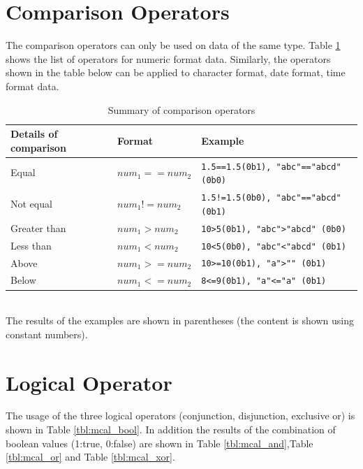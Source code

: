 \section{Comparison Operators }
The comparison operators can only be used on data of the same type. Table \ref{tbl:mcal_ope_comp} shows the list of operators for numeric format data. Similarly, the operators shown in the table below can be applied to character format, date format, time format data.  


\begin{table}[!hb]
\begin{center}
\caption{Summary of comparison operators \label{tbl:mcal_ope_comp}}
{\small
  \begin{tabular}{l|l|l} \hline
Details of comparison&Format&Example\\
\hline
Equal   & $num_1==num_2$ & \verb|1.5==1.5(0b1), "abc"=="abcd" (0b0)|\\
Not equal & $num_1!=num_2$ & \verb|1.5!=1.5(0b0), "abc"=="abcd" (0b1)|\\
Greater than & $num_1>num_2$  & \verb|10>5(0b1), "abc">"abcd" (0b0)|\\
Less than & $num_1<num_2$  & \verb|10<5(0b0), "abc"<"abcd" (0b1)|\\
Above       & $num_1>=num_2$ & \verb|10>=10(0b1), "a">"" (0b1) |\\
Below      & $num_1<=num_2$ & \verb|8<=9(0b1), "a"<="a" (0b1)| \\
\hline
  \end{tabular}
\\The results of the examples are shown in parentheses (the content is shown using constant numbers).  }
  \end{center}
\end{table}


\section{Logical Operator}
The usage of the three logical operators (conjunction, disjunction, exclusive or) is shown in Table \ref{tbl:mcal_bool}. In addition the results of the combination of boolean values (1:true, 0:false)  are shown in Table \ref{tbl:mcal_and},Table \ref{tbl:mcal_or} and Table \ref{tbl:mcal_xor}. 


